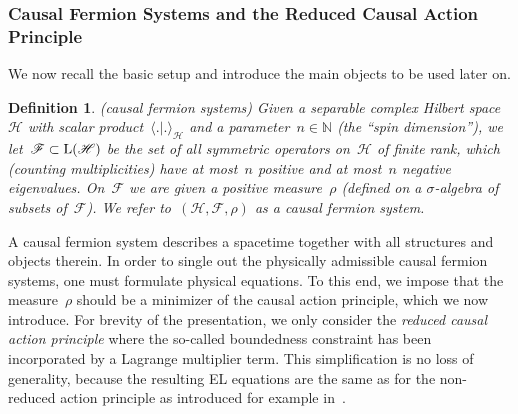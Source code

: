 \documentclass[reqno,11pt]{amsart}
\numberwithin{equation}{section}
\newtheorem{Def}{Definition}[section]
\newcommand{\la}{\langle}
\newcommand{\ra}{\rangle}
\newcommand{\1}{\mathds{1}}
\newcommand{\N}{\mathbb{N}}
\renewcommand{\H}{\mathscr{H}}
\newcommand{\Lin}{\text{\rm{L}}}
\newcommand{\F}{{\mathscr{F}}}
\begin{document}
\subsubsection{Causal Fermion Systems and the Reduced Causal Action Principle}
We now recall the basic setup and introduce the main objects to be used later on.
\begin{Def} \label{defcfs} (causal fermion systems) {\em{ %
Given a separable complex Hilbert space~$\H$ with scalar product~$\la .|. \ra_\H$
and a parameter~$n \in \N$ (the {\em{``spin dimension''}}), we let~$\F \subset \Lin(\H)$ be the set of all
symmetric operators on~$\H$ of finite rank, which (counting multiplicities) have
at most~$n$ positive and at most~$n$ negative eigenvalues. On~$\F$ we are given
a positive measure~$\rho$ (defined on a $\sigma$-algebra of subsets of~$\F$).
We refer to~$(\H, \F, \rho)$ as a {\em{causal fermion system}}.
}}
\end{Def} \noindent

A causal fermion system describes a spacetime together
with all structures and objects therein.
In order to single out the physically admissible
causal fermion systems, one must formulate physical equations. To this end, we impose that
the measure~$\rho$ should be a minimizer of the causal action principle,
which we now introduce. For brevity of the presentation, we only consider the
{\em{reduced causal action principle}} where the so-called boundedness constraint has been
incorporated by a Lagrange multiplier term. This simplification is no loss of generality, because
the resulting EL equations are the same as for the non-reduced action principle
as introduced for example in~\cite[Section~\S1.1.1]{cfs}.
\end{document}
